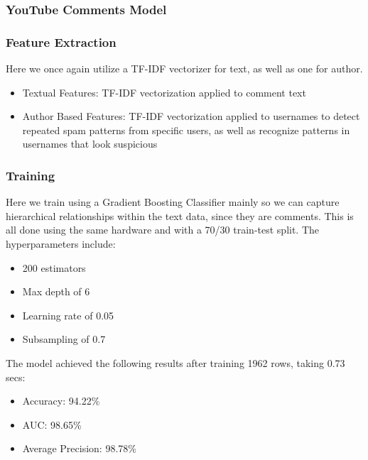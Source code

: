 \documentclass{article}
\begin{document}
\subsubsection{YouTube Comments Model}
\subsubsection*{Feature Extraction}

Here we once again utilize a TF-IDF vectorizer for text, as well as one for author.

\begin{itemize}
    \item Textual Features: TF-IDF vectorization applied to comment text
    \item Author Based Features: TF-IDF vectorization applied to usernames to detect repeated spam patterns from specific users, as well as recognize patterns in usernames that look suspicious
\end{itemize}

\subsubsection*{Training}

Here we train using a Gradient Boosting Classifier mainly so we can capture hierarchical relationships within the text data, since they are comments. This is all done using the same hardware and with a 70/30 train-test split. The hyperparameters include:

\begin{itemize}
    \item 200 estimators
    \item Max depth of 6
    \item Learning rate of 0.05
    \item Subsampling of 0.7
\end{itemize}

The model achieved the following results after training 1962 rows, taking 0.73 secs:

\begin{itemize}
    \item Accuracy: 94.22\%
    \item AUC: 98.65\%
    \item Average Precision: 98.78\%
\end{itemize}
\end{document}
